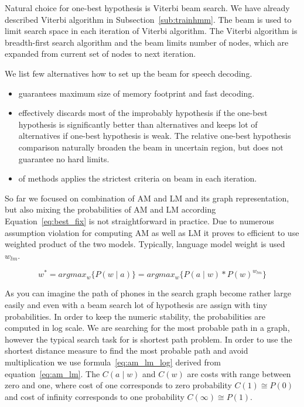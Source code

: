 {Natural choice for one-best hypothesis is Viterbi beam search\cite{huang2001spoken}.
We have already described Viterbi algorithm in Subsection~\ref{sub:trainhmm}.
The beam is used to limit search space in each iteration of Viterbi algorithm.
The Viterbi algorithm is breadth-first search algorithm and the beam limits number of nodes, which are expanded from current set of nodes to next iteration.


We list few alternatives how to set up the beam for speech decoding.
\begin{itemize}
    \item {} guarantees maximum size of memory footprint and fast decoding.
    \item {} effectively discards most of the improbably hypothesis if the one-best hypothesis is significantly better than alternatives and keeps lot of alternatives if one-best hypothesis is weak.
        The relative one-best hypothesis comparison naturally broaden the beam in uncertain region, but does not guarantee no hard limits.
    \item {} of methods applies the strictest criteria on beam in each iteration.
\end{itemize}


So far we focused on combination of \ac{AM} and \ac{LM} and its graph representation, but also mixing the probabilities of \ac{AM} and \ac{LM} according Equation~\ref{eq:best_fix} is not straightforward in practice. 
Due to numerous assumption violation for computing \ac{AM} as well as \ac{LM} it proves to efficient to use weighted product of the two models.
Typically, language model weight is used $w_{lm}$.

\begin{equation}\label{eq:am_lm}
    w^* = argmax_{w}\{P(w \mid a)\} = argmax_{w}\{P(a \mid w) * P(w)^{w_{lm}}\}
\end{equation}

As you can imagine the path of phones in the search graph become rather large easily and even with a beam search lot of hypothesis are assign with tiny probabilities.
In order to keep the numeric stability, the probabilities are computed in log scale. We are searching for the most probable path in a graph, however the typical search task for is shortest path problem.
In order to use the shortest distance measure to find the most probable path and avoid multiplication we use formula~\ref{eq:am_lm_log} derived from equation~\ref{eq:am_lm}.
The $C(a \mid w)$ and $C(w)$ are costs with range between zero and one, where cost of one corresponds to zero probability $C(1) \cong P(0)$ and cost of infinity corresponds to one probability $C(\infty) \cong P(1)$.

}
